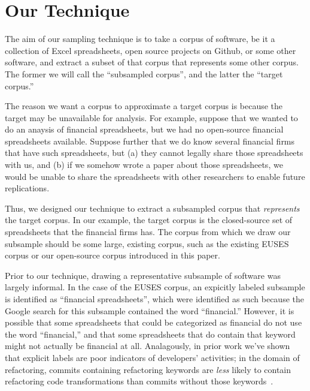 \documentclass[conference]{IEEEtran}
\begin{document}
\section{Our Technique}\label{sec:technique}

The aim of our sampling technique is to take a corpus of software, be it 
a collection of Excel spreadsheets, open source projects on Github, 
or some other software, and extract a subset of that corpus that represents
some other corpus.
The former we will call the ``subsampled corpus'', and the latter the
``target corpus.''

The reason we want a corpus to approximate a target corpus is because the 
target may be unavailable for analysis.
For example, suppose that we wanted to do an anaysis of financial spreadsheets,
but we had no open-source financial spreadsheets available.
Suppose further that we do know several financial firms that have such spreadsheets,
but (a) they cannot legally share those spreadsheets with us, and (b) if we somehow wrote a paper
about those spreadsheets, we would be unable to share the spreadsheets with other researchers
to enable future replications.

Thus, we designed our technique to extract a subsampled corpus that \emph{represents}
the target corpus.
In our example, the target corpus is the closed-source set of spreadsheets that the 
financial firms has.
The corpus from which we draw our subsample should be some large, existing corpus, such
as the existing EUSES corpus or our open-source corpus introduced in this paper.


Prior to our technique, drawing a representative subsample of software was largely
informal.
In the case of the EUSES corpus, an expicitly labeled subsample is identified as ``financial spreadsheets'',
which were identified as such because the Google search for this subsample
contained the word ``financial.''
However, it is possible that some spreadsheets that could be categorized as financial do not
use the word ``financial,'' and that some spreadsheets that do contain that keyword might not
actually be financial at all.
Analagously, in prior work we've shown that explicit labels are poor indicators of developers'
activities; in the domain of refactoring, commits containing refactoring keywords are \emph{less}
likely to contain refactoring code transformations than commits without those keywords~\cite{HowWeRefactor}.
\end{document}

